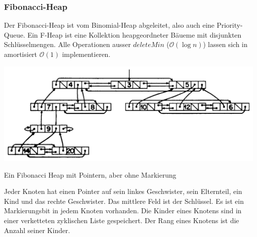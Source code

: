 \documentclass[a4paper, 9pt, DIV=20]{scrartcl}
\newcommand{\Oh}{\mathcal{O}}
\begin{document}
\subsubsection{Fibonacci-Heap} Der Fibonacci-Heap ist vom Binomial-Heap abgeleitet, also auch eine Priority-Queue. Ein F-Heap ist eine Kollektion heapgeordneter Bäueme mit disjunkten Schlüsselmengen. Alle Operationen ausser $deleteMin$ ($\Oh(\log{n})$) lassen sich in amortisiert $\Oh(1)$ implementieren. 

\begin{center}
\includegraphics[width=\linewidth]{FibonacciHeap}

Ein Fibonacci Heap mit Pointern, aber ohne Markierung
\end{center}
Jeder Knoten hat einen Pointer auf sein linkes Geschwister, sein Elternteil, ein Kind und das rechte Geschwister. Das mittlere Feld ist der Schlüssel. Es ist ein Markierungsbit in jedem Knoten vorhanden. Die Kinder eines Knotens sind in einer verketteten zyklischen Liste gespeichert. Der Rang eines Knotens ist die Anzahl seiner Kinder.
\end{document}
